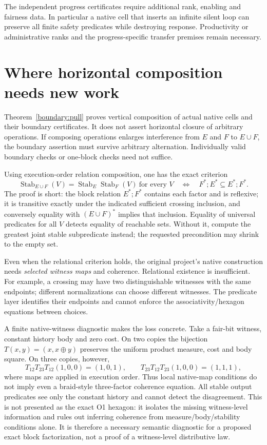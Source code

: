 \documentclass[11pt]{article}
\newcommand{\Stab}{\operatorname{Stab}}
\begin{document}
The independent progress certificates require additional rank, enabling and fairness data. In particular a native cell that inserts an infinite silent loop can preserve all finite safety predicates while destroying response. Productivity or administrative ranks and the progress-specific transfer premises remain necessary.

\section{Where horizontal composition needs new work}
Theorem~\ref{boundary:pull} proves vertical composition of actual native cells and their boundary certificates. It does not assert horizontal closure of arbitrary operations. If composing operations enlarges interference from $E$ and $F$ to $E\cup F$, the boundary assertion must survive arbitrary alternation. Individually valid boundary checks or one-block checks need not suffice.

Using execution-order relation composition, one has the exact criterion
\[
 \Stab_{E\cup F}(V)=\Stab_E\Stab_F(V)\ \text{for every }V
 \quad\Longleftrightarrow\quad
 F^*;E^*\subseteq E^*;F^*.
\]
The proof is short: the block relation $E^*;F^*$ contains each factor and is reflexive; it is transitive exactly under the indicated sufficient crossing inclusion, and conversely equality with $(E\cup F)^*$ implies that inclusion. Equality of universal predicates for all $V$ detects equality of reachable sets. Without it, compute the greatest joint stable subpredicate instead; the requested precondition may shrink to the empty set.

Even when the relational criterion holds, the original project's native construction needs \emph{selected witness maps} and coherence. Relational existence is insufficient. For example, a crossing may have two distinguishable witnesses with the same endpoints; different normalizations can choose different witnesses. The predicate layer identifies their endpoints and cannot enforce the associativity/hexagon equations between choices.

A finite native-witness diagnostic makes the loss concrete. Take a fair-bit witness, constant history body and zero cost. On two copies the bijection $T(x,y)=(x,x\mathbin\oplus y)$ preserves the uniform product measure, cost and body square. On three copies, however,
\[
 T_{12}T_{23}T_{12}(1,0,0)=(1,0,1),\qquad
 T_{23}T_{12}T_{23}(1,0,0)=(1,1,1),
\]
where maps are applied in execution order. Thus local native-map conditions do not imply even a braid-style three-factor coherence equation. All stable output predicates see only the constant history and cannot detect the disagreement. This is not presented as the exact O1 hexagon: it isolates the missing witness-level information and rules out inferring coherence from measure/body/stability conditions alone. It is therefore a necessary semantic diagnostic for a proposed exact block factorization, not a proof of a witness-level distributive law.
\end{document}
